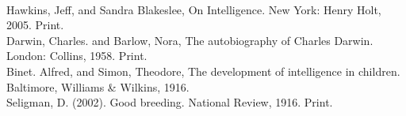 \documentclass[12pt, oneside]{article}
\begin{document}
\noindent 

\begin{workscited}
\bibent \\
\bibent Hawkins, Jeff, and Sandra Blakeslee, On Intelligence. New York: Henry Holt, 2005. Print. \\
\bibent Darwin, Charles. and Barlow, Nora, The autobiography of Charles Darwin. London: Collins, 1958. Print. \\
\bibent Binet. Alfred, and Simon, Theodore, The development of intelligence in children. Baltimore, Williams \& Wilkins, 1916. \\
\bibent Seligman, D. (2002). Good breeding. National Review, 1916.
Print. \\
\end{workscited}
\end{document}
